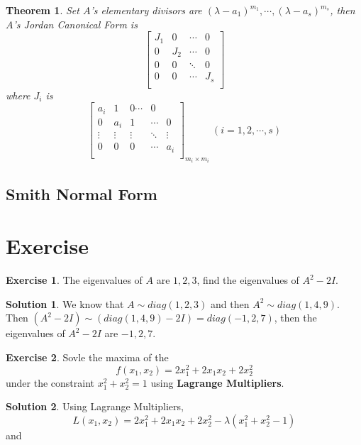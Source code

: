 \documentclass{article}
\newtheorem{theorem}{Theorem}[section]
\theoremstyle{definition}
\newtheorem{exe}{Exercise}[section]
\newtheorem{sol}{Solution}[exe]
\begin{document}
\begin{theorem}
    Set $A$'s elementary divisors are $(\lambda-a_1)^{m_1},\cdots,(\lambda-a_s)^{m_s}$, then $A$'s Jordan Canonical Form is
    $$\begin{bmatrix}
        J_1&0&\cdots&0\\
        0&J_2&\cdots&0\\
        0&0&\ddots&0\\
        0&0&\cdots&J_s\\
    \end{bmatrix}$$
    where $J_i$ is 
    $$\begin{bmatrix}
        a_i&1&0\cdots&0\\
        0&a_i&1&\cdots&0\\
        \vdots&\vdots&\vdots&\ddots&\vdots\\
        0&0&0&\cdots&a_i\\
    \end{bmatrix}_{m_i\times m_i}\ (i=1,2,\cdots,s)$$
\end{theorem}










\subsection{Smith Normal Form}








\newpage
\section{Exercise}

\begin{exe}
The eigenvalues of $A$ are $1,2,3$, find the eigenvalues of $A^{2}-2I$.
\end{exe}

\begin{sol}
    We know that $A\sim diag(1,2,3)$ and then $A^{2}\sim diag(1,4,9)$.
    Then $(A^{2}-2I)\sim (diag(1,4,9)-2I)=diag(-1,2,7)$, then the eigenvalues 
    of $A^{2}-2I$ are $-1,2,7$.
\end{sol}

\begin{exe}
    Sovle the maxima of the $$f(x_{1},x_{2})=2x_{1}^{2}+2x_{1}x_{2}+2x_{2}^{2}$$
    under the constraint $x_{1}^{2}+x_{2}^{2}=1$ using \textbf{Lagrange Multipliers}.
\end{exe}

\begin{sol}
    Using Lagrange Multipliers,
    $$L(x_{1},x_{2})=2x_{1}^{2}+2x_{1}x_{2}+2x_{2}^{2}-\lambda(x_{1}^{2}+x_{2}^{2}-1)$$
    and 
  
\end{sol}
\end{document}
